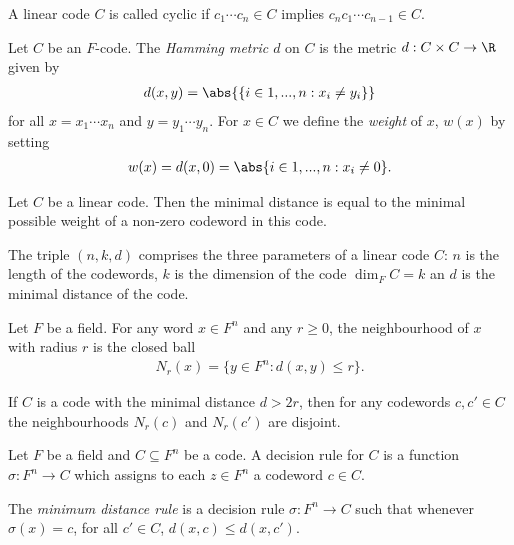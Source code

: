 \documentclass{article}
\begin{document}
\begin{definition}
	A linear code $C$ is called cyclic if $c_1\cdots c_n\in C$ implies $c_nc_1\cdots c_{n-1}\in C$.
\end{definition}

\begin{definition}
	Let $C$ be an $F$-code. The \emph{Hamming metric $d$} on $C$ is the metric
	$d:C\times C\to\R$ given by
	\begin{align*}
		d(x,y) = \abs{\{i\in{1,...,n}:x_i\not=y_i\}}
	\end{align*}
	for all $x=x_1\cdots x_n$ and $y=y_1\cdots y_n$.
	For $x\in C$ we define the \emph{weight} of $x$, $w(x)$ by setting
	\begin{align*}
		w(x)=d(x,0)=\abs\{i\in {1,...,n} : x_i\not=0\}.
	\end{align*}
\end{definition}

\begin{lemma}[Lecture 10]
	Let $C$ be a linear code. Then the minimal distance is equal to the minimal possible weight
	of a non-zero codeword in this code.
\end{lemma}

\begin{definition}[Lecture 10]
	The triple $(n,k,d)$ comprises the three parameters of a linear code $C$: $n$ is the length of the
	codewords, $k$ is the dimension of the code $\dim_F C=k$ an $d$ is the minimal distance of the code.
\end{definition}

\begin{definition}[Lecture 10]
	Let $F$ be a field. For any word $x\in F^n$ and any $r\geq 0$, the neighbourhood of $x$ with radius
	$r$ is the closed ball
	\begin{align*}
		N_r(x)=\{y\in F^n : d(x,y)\leq r\}.
	\end{align*}
\end{definition}

\begin{lemma}[Lecture 10]
	If $C$ is a code with the minimal distance $d>2r$, then for any codewords $c,c'\in C$ the neighbourhoods
	$N_r(c)$ and $N_r(c')$ are disjoint.
\end{lemma}

\begin{definition}[Lecture 10]
	Let $F$ be a field and $C\subseteq F^n$ be a code. A decision rule for $C$ is a function
	$\sigma:F^n\to C$ which assigns to each $z\in F^n$ a codeword $c\in C$.
\end{definition}

\begin{definition}
	The \emph{minimum distance rule} is a decision rule $\sigma:F^n\to C$ such that
	whenever $\sigma(x)=c$, for all $c'\in C$, $d(x,c) \leq d(x,c')$.
\end{definition}
\end{document}
